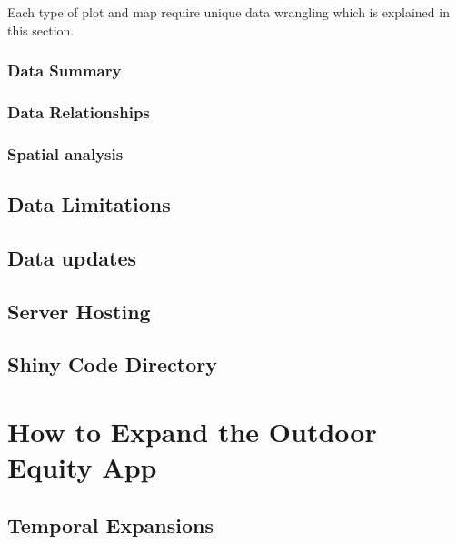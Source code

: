 \documentclass[
]{book}
\begin{document}
Each type of plot and map require unique data wrangling which is explained in this section.

\hypertarget{data-summary}{%
\subsubsection{Data Summary}\label{data-summary}}

\hypertarget{data-relationships}{%
\subsubsection{Data Relationships}\label{data-relationships}}

\hypertarget{spatial-analysis}{%
\subsubsection{Spatial analysis}\label{spatial-analysis}}

\hypertarget{data-limitations}{%
\subsection{Data Limitations}\label{data-limitations}}

\hypertarget{data-updates}{%
\subsection{Data updates}\label{data-updates}}

\hypertarget{server-hosting}{%
\subsection{Server Hosting}\label{server-hosting}}

\hypertarget{shiny-code-directory}{%
\subsection{Shiny Code Directory}\label{shiny-code-directory}}

\hypertarget{how-to-expand-the-outdoor-equity-app}{%
\section{How to Expand the Outdoor Equity App}\label{how-to-expand-the-outdoor-equity-app}}

\hypertarget{temporal-expansions}{%
\subsection{Temporal Expansions}\label{temporal-expansions}}
\end{document}
